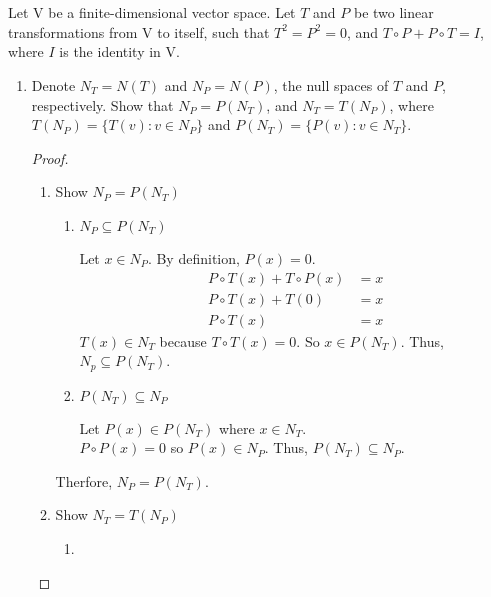 \documentclass[11pt]{scrartcl}
\begin{document}
\section{}
Let $\mathrm{V}$ be a finite-dimensional vector space. Let $T$ and $P$ be two linear transformations from $\mathrm{V}$ to itself, such that $T^2= P^2 = 0$, and $T \circ P + P \circ T = I$, where $I$ is the identity in $\mathrm{V}$.
\begin{enumerate}[label=\alph*.]
	\item{
	      Denote $N_T = N(T)$ and $N_P = N(P)$, the null spaces of $T$ and $P$, respectively.
	      Show that $N_P = P(N_T)$, and $N_T = T(N_P)$, where $T(N_P) = \{ T(v): v \in N_P \}$ and $P(N_T) = \{ P(v): v \in N_T \}$.
	      \begin{proof}\
		      \begin{enumerate}[label=\roman*.]
			      \item{
			            Show $N_P = P(N_T)$
			            \begin{enumerate}[label=\arabic*.]
				            \item{
				                  $N_P \subseteq P(N_T)$\par
				                  Let $x \in N_P$. By definition, $P(x) = 0$.
				                  \begin{align*}
					                  P \circ T(x) + T \circ P(x) & = x \\
					                  P \circ T(x) + T(0)         & = x \\
					                  P \circ T(x)                & = x
				                  \end{align*}
				                  $T(x) \in N_T$ because $T \circ T(x) = 0$.
				                  So $x \in P(N_T)$. Thus, $N_p \subseteq P(N_T)$.
				                  }
				            \item{
				                  $P(N_T) \subseteq N_P $\par
				                  Let $P(x) \in P(N_T)$ where $x \in N_T$.\\
				                  $P \circ P(x) = 0$ so $P(x) \in N_P$. Thus, $P(N_T) \subseteq N_P$.
				                  }
			            \end{enumerate}
			            Therfore, $N_P = P(N_T)$.
			            }
			      \item{
			            Show $N_T = T(N_P)$
			            \begin{enumerate}[label=\arabic*.]
				            \item{
}
\end{enumerate}}
\end{enumerate}
\end{proof}}
\end{enumerate}
\end{document}
